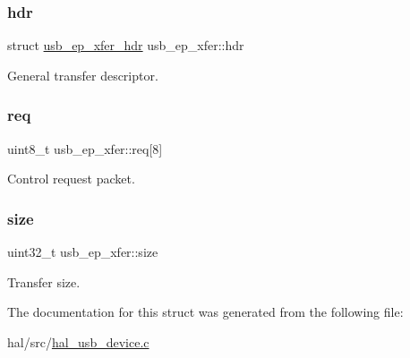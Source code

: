 \subsubsection{\texorpdfstring{hdr}{hdr}}
{\footnotesize\ttfamily struct \hyperlink{structusb__ep__xfer__hdr}{usb\+\_\+ep\+\_\+xfer\+\_\+hdr} usb\+\_\+ep\+\_\+xfer\+::hdr}

General transfer descriptor. \mbox{\label{structusb__ep__xfer_aca9c1de64869e16261275fab5b27e24c}} 
\subsubsection{\texorpdfstring{req}{req}}
{\footnotesize\ttfamily uint8\+\_\+t usb\+\_\+ep\+\_\+xfer\+::req\mbox{[}8\mbox{]}}

Control request packet. \mbox{\label{structusb__ep__xfer_a06f284f1b0744e5da096adf917b9705b}} 
\subsubsection{\texorpdfstring{size}{size}}
{\footnotesize\ttfamily uint32\+\_\+t usb\+\_\+ep\+\_\+xfer\+::size}

Transfer size. 

The documentation for this struct was generated from the following file\+:\begin{DoxyCompactItemize}
\item 
hal/src/\hyperlink{hal__usb__device_8c}{hal\+\_\+usb\+\_\+device.\+c}\end{DoxyCompactItemize}
